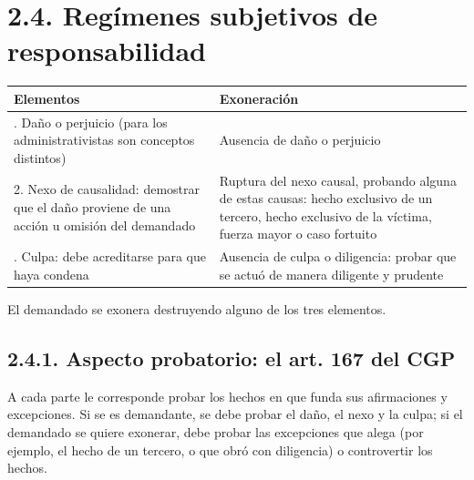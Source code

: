 \section{2.4. Regímenes subjetivos de responsabilidad}
\begin{tabla}
\begin{longtable}{|>{\raggedright\arraybackslash}m{}|>{\raggedright\arraybackslash}m{}|}
\hline
\cellcolor[HTML]{1F3864}\textcolor[HTML]{FFFFFF}{\textbf{Elementos}} & \cellcolor[HTML]{1F3864}\textcolor[HTML]{FFFFFF}{\textbf{Exoneración}} \\ \hline
1. Daño o perjuicio (para los administrativistas son conceptos distintos) & Ausencia de daño o perjuicio \\ \hline
\cellcolor[HTML]{F2F5FA}2. Nexo de causalidad: demostrar que el daño proviene de una acción u omisión del demandado & \cellcolor[HTML]{F2F5FA}Ruptura del nexo causal, probando alguna de estas causas: hecho exclusivo de un tercero, hecho exclusivo de la víctima, fuerza mayor o caso fortuito \\ \hline
3. Culpa: debe acreditarse para que haya condena & Ausencia de culpa o diligencia: probar que se actuó de manera diligente y prudente \\ \hline
\end{longtable}
\end{tabla}
El demandado se exonera destruyendo alguno de los tres elementos.

\subsection{2.4.1. Aspecto probatorio: el art. 167 del CGP}
A cada parte le corresponde probar los hechos en que funda sus afirmaciones y excepciones. Si se es demandante, se debe probar el daño, el nexo y la culpa; si el demandado se quiere exonerar, debe probar las excepciones que alega (por ejemplo, el hecho de un tercero, o que obró con diligencia) o controvertir los hechos.

